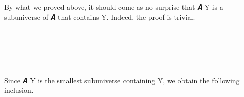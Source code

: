 \ccpad
By what we proved above, it should come as no surprise that  \ab 𝑨 \ab Y is a subuniverse of \ab 𝑨 that contains \ab Y. Indeed, the proof is trivial.
\ccpad
\begin{code}%
\>[0][@{}l@{\AgdaIndent{1}}]%
\>[1]\AgdaSpace{}%
\AgdaSymbol{:}\AgdaSpace{}%
\AgdaSymbol{\{}\AgdaSpace{}%
\AgdaSymbol{:}\AgdaSpace{}%
\AgdaSpace{}%
\AgdaSpace{}%
\AgdaSymbol{\}\{}\AgdaSpace{}%
\AgdaSymbol{:}\AgdaSpace{}%
\AgdaSpace{}%
\AgdaSpace{}%
\AgdaSpace{}%
\AgdaSpace{}%
\AgdaSymbol{\}}\AgdaSpace{}%
\AgdaSpace{}%
\AgdaSpace{}%
\AgdaSpace{}%
\AgdaSpace{}%
\AgdaSpace{}%
\AgdaSpace{}%
\<%
\\
%
\>[1]\AgdaSpace{}%
\AgdaSymbol{=}\AgdaSpace{}%
\<%
\\
%
\\[\AgdaEmptyExtraSkip]%
%
\>[1]\AgdaSpace{}%
\AgdaSymbol{:}\AgdaSpace{}%
\AgdaSymbol{\{}\AgdaSpace{}%
\AgdaSymbol{:}\AgdaSpace{}%
\AgdaSpace{}%
\AgdaSpace{}%
\AgdaSymbol{\}\{}\AgdaSpace{}%
\AgdaSymbol{:}\AgdaSpace{}%
\AgdaSpace{}%
\AgdaSpace{}%
\AgdaSpace{}%
\AgdaSpace{}%
\AgdaSymbol{\}}\AgdaSpace{}%
\AgdaSpace{}%
\AgdaSpace{}%
\AgdaSpace{}%
\AgdaSpace{}%
\AgdaSpace{}%
\<%
\\
%
\>[1]\AgdaSpace{}%
\AgdaSymbol{\{}\AgdaSymbol{\}}\AgdaSpace{}%
\AgdaSpace{}%
\AgdaSymbol{=}\AgdaSpace{}%
\AgdaSpace{}%
\<%
\end{code}
\ccpad
Since  \ab 𝑨 \ab Y is the smallest subuniverse containing \ab Y, we obtain the following inclusion.
\ccpad
